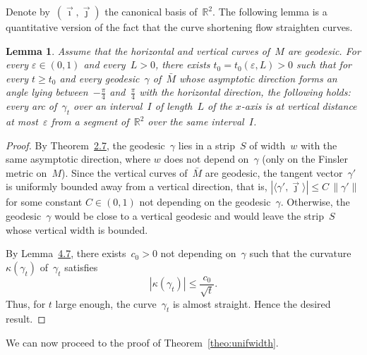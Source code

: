 \documentclass[10pt,a4paper]{amsart}
\numberwithin{equation}{section}
\newcommand{\R}{\mathbb{R}}
\newtheorem{lemm}[theo]{Lemma}
\begin{document}
Denote by~$(\vec{\imath},\vec{\jmath})$ the canonical basis of~$\R^2$. The following lemma is a quantitative version of the fact that the curve shortening flow straighten curves.




\begin{lemm}\label{lem:L'}
Assume that the horizontal and vertical curves of~$M$ are geodesic. For every $\varepsilon \in (0,1)$ and every~$L>0$, there exists $t_0=t_0(\varepsilon,L)>0$ such that for every $t \geq t_0$ and every geodesic~$\gamma$ of~$\bar{M}$ whose asymptotic direction forms an angle lying between~$-\frac{\pi}{4}$ and~$\frac{\pi}{4}$ with the horizontal direction, the following holds: every arc of~$\gamma_t$ over an interval~$I$ of length~$L$ of the $x$-axis is at vertical distance at most~$\varepsilon$ from a segment of~$\R^2$ over the same interval~$I$.
\end{lemm}

\begin{proof}
By Theorem~\href{https://ahl.centre-mersenne.org/item/AHL_2024__7__1131_0/}{2.7}, the geodesic~$\gamma$ lies in a strip~$S$ of width~$w$ with the same asymptotic direction, where $w$ does not depend on~$\gamma$ (only on the Finsler metric on~$M$). Since the vertical curves of~$\bar{M}$ are geodesic, the tangent vector~$\gamma'$ is uniformly bounded away from a vertical direction, that is, $|\langle \gamma',\vec{\jmath} \rangle| \leq C \, \lVert \gamma' \rVert$ for some constant $C \in (0,1)$ not depending on the geodesic~$\gamma$. Otherwise, the geodesic~$\gamma$ would be close to a vertical geodesic and would leave the strip~$S$ whose vertical width is bounded.

By Lemma~\href{https://ahl.centre-mersenne.org/item/AHL_2024__7__1131_0/}{4.7}, there exists~$c_0>0$ not depending on~$\gamma$ such that the curvature~$\kappa(\gamma_t)$ of~$\gamma_t$ satisfies
\[
|\kappa(\gamma_t)| \leq \frac{c_0}{\sqrt{t}}.
\]
Thus, for $t$ large enough, the curve~$\gamma_t$ is almost straight. Hence the desired result.
\end{proof}

We can now proceed to the proof of Theorem~\ref{theo:unifwidth}.
\end{document}

